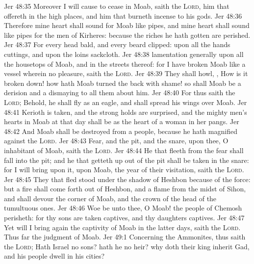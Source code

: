 \vs Jer 48:35 Moreover I will cause to cease in Moab, saith the \textsc{Lord}, him that offereth in the high places, and him that burneth incense to his gods.
\vs Jer 48:36 Therefore mine heart shall sound for Moab like pipes, and mine heart shall sound like pipes for the men of Kirheres: because the riches  he hath gotten are perished.
\vs Jer 48:37 For every head  bald, and every beard clipped: upon all the hands  cuttings, and upon the loins sackcloth.
\vs Jer 48:38  lamentation generally upon all the housetops of Moab, and in the streets thereof: for I have broken Moab like a vessel wherein  no pleasure, saith the \textsc{Lord}.
\vs Jer 48:39 They shall howl, , How is it broken down! how hath Moab turned the back with shame! so shall Moab be a derision and a dismaying to all them about him.
\vs Jer 48:40 For thus saith the \textsc{Lord}; Behold, he shall fly as an eagle, and shall spread his wings over Moab.
\vs Jer 48:41 Kerioth is taken, and the strong holds are surprised, and the mighty men's hearts in Moab at that day shall be as the heart of a woman in her pangs.
\vs Jer 48:42 And Moab shall be destroyed from  a people, because he hath magnified  against the \textsc{Lord}.
\vs Jer 48:43 Fear, and the pit, and the snare,  upon thee, O inhabitant of Moab, saith the \textsc{Lord}.
\vs Jer 48:44 He that fleeth from the fear shall fall into the pit; and he that getteth up out of the pit shall be taken in the snare: for I will bring upon it,  upon Moab, the year of their visitation, saith the \textsc{Lord}.
\vs Jer 48:45 They that fled stood under the shadow of Heshbon because of the force: but a fire shall come forth out of Heshbon, and a flame from the midst of Sihon, and shall devour the corner of Moab, and the crown of the head of the tumultuous ones.
\vs Jer 48:46 Woe be unto thee, O Moab! the people of Chemosh perisheth: for thy sons are taken captives, and thy daughters captives.
\vs Jer 48:47 Yet will I bring again the captivity of Moab in the latter days, saith the \textsc{Lord}. Thus far  the judgment of Moab.
\vs Jer 49:1 Concerning the Ammonites, thus saith the \textsc{Lord}; Hath Israel no sons? hath he no heir? why  doth their king inherit Gad, and his people dwell in his cities?
